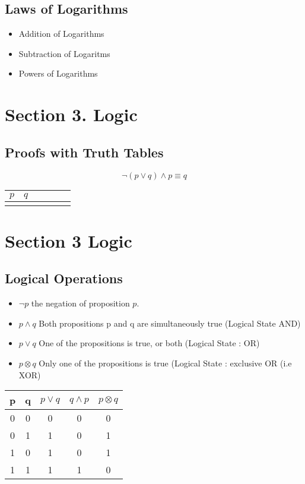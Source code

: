 \documentclass[]{report}
\begin{document}
\subsection*{Laws of Logarithms}
\begin{itemize}
	\item Addition of Logarithms
	\item Subtraction of Logaritms
	\item Powers of Logarithms
\end{itemize}


\section*{Section 3. Logic}

\subsection*{Proofs with Truth Tables}

\[ \neg(p \vee q) \wedge p \equiv q \]
\begin{center}
	\begin{tabular}{|c|c||c|c||c|c|}
		\hline $p$ & $q$ &  &  &  &  \\ 
		\hline  &  &  &  &  &  \\ 
		\hline 
	\end{tabular} 
\end{center}



\section{Section 3 Logic}
\subsection{Logical Operations}
\begin{itemize}
	\item $\neg p$ the negation of proposition $p$.
	\item $p \wedge q$ Both propositions p and q are simultaneously true (Logical State AND)
	\item $p \vee q $ One of the propositions is true, or both (Logical State : OR)
	\item $p \otimes q$ Only one of the propositions is true (Logical State : exclusive OR (i.e XOR)
\end{itemize}
\begin{center}
	\begin{tabular}{|c|c|c|c|c|}
		\hline
		p & q & $p \vee q$ & $q \wedge p$ & $p \otimes q$ \\
		\hline
		0 & 0 & 0 & 0 & 0 \\
		0 & 1 & 1 & 0 & 1\\
		1 & 0 & 1 & 0 & 1 \\
		1 & 1 & 1 & 1 & 0\\
		\hline
	\end{tabular}
\end{center}
\end{document}
